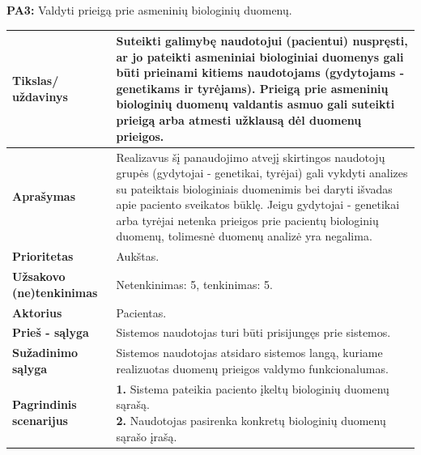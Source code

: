 \documentclass[12pt]{article}
\begin{document}
\newpage

\noindent \textbf{PA3:} Valdyti prieigą prie asmeninių biologinių duomenų.
\label{sec:PA3}
\begin{table}[htb!]
    \captionsetup{justification=centering}
    \begin{tabular}{|m{3cm}|m{13.7cm}|}
        \hline
        \raggedleft \textbf{\cellcolor{deepchampagne}Tikslas/ uždavinys} &
        Suteikti galimybę naudotojui (pacientui) nuspręsti, ar jo pateikti
        asmeniniai biologiniai duomenys gali būti prieinami kitiems
        naudotojams (gydytojams - genetikams ir tyrėjams). Prieigą prie
        asmeninių biologinių duomenų valdantis asmuo gali suteikti prieigą arba
        atmesti užklausą dėl duomenų prieigos. \\
        \hline
        \raggedleft \textbf{\cellcolor{deepchampagne}Aprašymas} &
        Realizavus šį panaudojimo atvejį skirtingos naudotojų grupės
        (gydytojai - genetikai, tyrėjai) gali vykdyti analizes su pateiktais
        biologiniais duomenimis bei daryti išvadas apie paciento sveikatos
        būklę. Jeigu gydytojai - genetikai arba tyrėjai netenka prieigos
        prie pacientų biologinių duomenų, tolimesnė duomenų analizė yra
        negalima. \\
        \hline
        \raggedleft \textbf{\cellcolor{deepchampagne}Prioritetas} & Aukštas. \\
        \hline
        \raggedleft \textbf{\cellcolor{deepchampagne}Užsakovo (ne)tenkinimas} &
        Netenkinimas: 5, tenkinimas: 5. \\
        \hline
        \raggedleft \textbf{\cellcolor{deepchampagne}Aktorius} &
        Pacientas. \\
        \hline
        \raggedleft \textbf{\cellcolor{deepchampagne}Prieš - sąlyga} &
        Sistemos naudotojas turi būti prisijungęs prie sistemos. \\
        \hline
        \raggedleft \textbf{\cellcolor{deepchampagne}Sužadinimo sąlyga} &
        Sistemos naudotojas atsidaro sistemos langą, kuriame realizuotas duomenų
        prieigos valdymo funkcionalumas. \\
        \hline
        \raggedleft \textbf{\cellcolor{deepchampagne}Pagrindinis
        scenarijus} & \vskip 5pt
        \makecell[l]{\parbox[t]{13.7cm}{
            \textbf{1.} {Sistema pateikia paciento
            įkeltų biologinių duomenų sąrašą.} \\
            \textbf{2.} \textcolor{dartmouthgreen}{Naudotojas pasirenka
            konkretų biologinių duomenų sąrašo įrašą.} \\
}}
\end{tabular}
\end{table}
\end{document}
